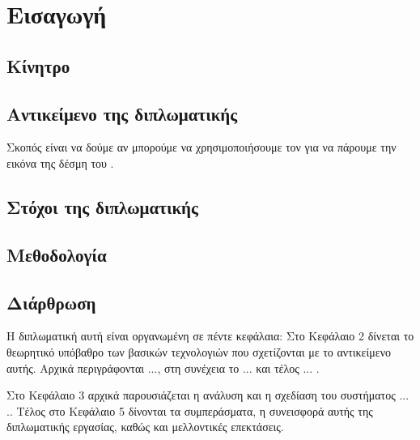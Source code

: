 \chapter{Εισαγωγή}

\section{Κίνητρο}


\section{Αντικείμενο της διπλωματικής}
Σκοπός είναι να δούμε αν μπορούμε να χρησιμοποιήσουμε τον  για να πάρουμε την εικόνα της δέσμη του .

\section{Στόχοι της διπλωματικής}

\section{Μεθοδολογία}

\section{Διάρθρωση}
Η διπλωματική αυτή είναι οργανωμένη σε πέντε κεφάλαια: Στο Κεφάλαιο 2
δίνεται το θεωρητικό υπόβαθρο των βασικών τεχνολογιών που
σχετίζονται με το αντικείμενο αυτής.
Αρχικά περιγράφονται ..., στη συνέχεια το ... και τέλος ... . 

Στο Κεφάλαιο 3 αρχικά παρουσιάζεται η ανάλυση και η σχεδίαση του συστήματος ... .. 
Τέλος στο Κεφάλαιο 5 δίνονται τα συμπεράσματα, η συνεισφορά αυτής της
διπλωματικής εργασίας, καθώς και μελλοντικές επεκτάσεις.
